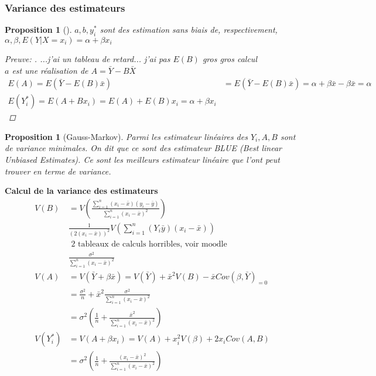 \documentclass{article}
\theoremstyle{plain}%
\newtheorem{prop}[thm]{Proposition}
\theoremstyle{definition}
\theoremstyle{remark}
\begin{document}
\subsubsection{Variance des estimateurs}

\begin{prop}[]
    $ a,b, y_i^* $ sont des estimation sans biais de, respectivement, $ \alpha, \beta, E(Y |X = x_i) = \alpha + \beta x_i $ 

    \begin{proof}[Preuve: ]
        ...j'ai un tableau de retard... j'ai pas $ E(B) $ gros gros calcul\\
        $ a $ est une réalisation de $ A = \bar{Y} - B \bar{X} $ 
        \begin{align*}
            E(A) = E(\bar{Y} - E(B) \bar{x}) &= E(\bar{Y} - E(B) \bar{x}) = \alpha + \beta  \bar{x}- \beta \bar{x} = \alpha  \\
            E(Y_i^*) = E(A + B x_i) = E(A) + E(B) x_i = \alpha + \beta x_i
        \end{align*}
    \end{proof}
\end{prop}

\begin{prop}[Gauss-Markov]
    Parmi les estimateur linéaires des $ Y_i, A,B $ sont de variance minimales. On dit que ce sont des estimateur BLUE (Best linear Unbiased Estimates). Ce sont les meilleurs estimateur linéaire que l'ont peut trouver en terme de variance.
\end{prop}

\textbf{Calcul de la variance des estimateurs}
\begin{align*}
    V(B) &= V(\frac{\sum_{i=1}^{n} (x_i - \bar{x})(y_i - \bar{y}) }{\sum_{i=1}^{n} (x_i - \bar{x})^2}) \\
        & \frac{1}{(2(x_i - \bar{x}))^2} V(\sum_{i=1}^{n} (Y_i \bar{y})(x_i - \bar{x}) ) \\
        &\text{ 2 tableaux de calculs horribles, voir moodle} \\
        & \frac{\sigma ^2}{\sum_{i=1}^{n} (x_i - \bar{x})^2} \\
    V(A)&= V(\bar{Y} + \beta \bar{x}) = V(\bar{Y}) + \bar{x}^2 V(B) - \bar{x} Cov(\beta , \bar{Y})_{=0} \\
        &= \frac{\sigma ^2}{n} + \bar{x}^2 \frac{\sigma ^2}{\sum_{i=1}^{n} (x_i - \bar{x})^2} \\
        &= \sigma ^2 ( \frac{1}{n} + \frac{\bar{x}^2}{\sum_{i=1}^{n}(x_i - \bar{x}) ^2 }) \\
    V(Y_i^*) &= V(A + \beta x_i) = V(A) + x_i^2 V(\beta ) + 2 x_i Cov(A,B) \\
        &= \sigma ^2 (\frac{1}{n} + \frac{(x_i - \bar{x})^2}{\sum_{i=1}^{n}(x_i - \bar{x})^2})
\end{align*}
\end{document}
